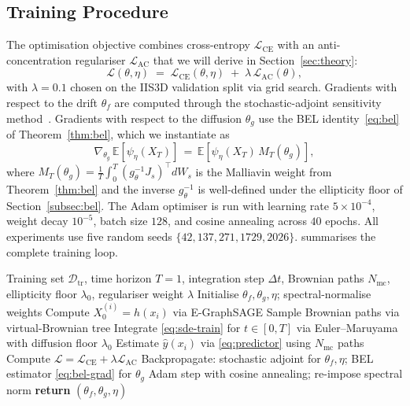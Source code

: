 \documentclass[journal,10pt]{IEEEtran}
\theoremstyle{definition}
\theoremstyle{remark}
\newcommand{\Exp}{\mathbb{E}}
\newcommand{\Dcal}{\mathcal{D}}
\newcommand{\Lcal}{\mathcal{L}}
\begin{document}
\subsection{Training Procedure}\label{subsec:training}
The optimisation objective combines cross-entropy
$\Lcal_{\mathrm{CE}}$ with an anti-concentration regulariser
$\Lcal_{\mathrm{AC}}$ that we will derive in Section~\ref{sec:theory}:
\begin{equation}\label{eq:loss}
  \Lcal(\theta,\eta) \;=\; \Lcal_{\mathrm{CE}}(\theta,\eta) \;+\;
   \lambda\,\Lcal_{\mathrm{AC}}(\theta),
\end{equation}
with $\lambda=0.1$ chosen on the IIS3D validation split via grid
search. Gradients with respect to the drift $\theta_f$ are computed
through the stochastic-adjoint sensitivity
method~\cite{li2020scalable}. Gradients with respect to the diffusion
$\theta_g$ use the BEL identity~\eqref{eq:bel} of
Theorem~\ref{thm:bel}, which we instantiate as
\begin{equation}\label{eq:bel-grad}
  \nabla_{\theta_g}\,\Exp[\psi_\eta(X_T)]
   \,=\,\Exp\!\left[\psi_\eta(X_T)\,M_T(\theta_g)\right],
\end{equation}
where $M_T(\theta_g)=\tfrac{1}{T}\int_0^T(g_\theta^{-1}J_s)^\top dW_s$
is the Malliavin weight from Theorem~\ref{thm:bel} and the inverse
$g_\theta^{-1}$ is well-defined under the ellipticity floor of
Section~\ref{subsec:bel}. The Adam optimiser is run with learning
rate $5\!\times\!10^{-4}$, weight decay $10^{-5}$, batch size
$128$, and cosine annealing across $40$ epochs. All experiments use
five random seeds $\{42,137,271,1729,2026\}$.
 summarises the complete training loop.

\begin{algorithm}[t]
\caption{Stochastic ODE-Guard Training}
\label{alg:train}
\small
\begin{algorithmic}[1]
\REQUIRE Training set $\Dcal_\mathrm{tr}$, time horizon $T{=}1$,
   integration step $\Delta t$, Brownian paths $N_\mathrm{mc}$,
   ellipticity floor $\lambda_0$, regulariser weight $\lambda$
\STATE Initialise $\theta_f,\theta_g,\eta$; spectral-normalise weights
  \FOR{mini-batch $\{(x_i,y_i)\}_{i=1}^B\sim\Dcal_\mathrm{tr}$}
    \STATE Compute $X_0^{(i)}=h(x_i)$ via E-GraphSAGE
    \STATE Sample Brownian paths via virtual-Brownian tree
    \STATE Integrate \eqref{eq:sde-train} for $t\in[0,T]$ via
            Euler--Maruyama with diffusion floor $\lambda_0$
    \STATE Estimate $\hat y(x_i)$ via \eqref{eq:predictor}
            using $N_\mathrm{mc}$ paths
    \STATE Compute $\Lcal=\Lcal_{\mathrm{CE}}+\lambda\Lcal_{\mathrm{AC}}$
    \STATE Backpropagate: stochastic adjoint for $\theta_f,\eta$;
            BEL estimator \eqref{eq:bel-grad} for $\theta_g$
    \STATE Adam step with cosine annealing; re-impose spectral norm
  \ENDFOR
\ENDFOR
\STATE \textbf{return} $(\theta_f,\theta_g,\eta)$
\end{algorithmic}
\end{algorithm}
\end{document}
